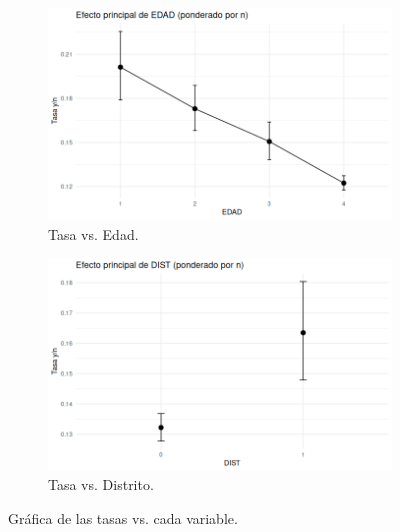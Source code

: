 \begin{figure}[h!]
    \vspace{0.5cm} %
    
    \begin{subfigure}[b]{0.48\textwidth}
        \centering
        \includegraphics[width=\textwidth]{Images/EDAD-seguros.png}
        \caption{Tasa vs. Edad.}
        \label{fig:img3}
    \end{subfigure}
    \hfill %
    \begin{subfigure}[b]{0.48\textwidth}
        \centering
        \includegraphics[width=\textwidth]{Images/DIST.png}
        \caption{Tasa vs. Distrito.}
        \label{fig:img4}
    \end{subfigure}
    
    \caption{Gráfica de las tasas vs. cada variable.}
    \label{fig:matriz_imagenes}
\end{figure}


